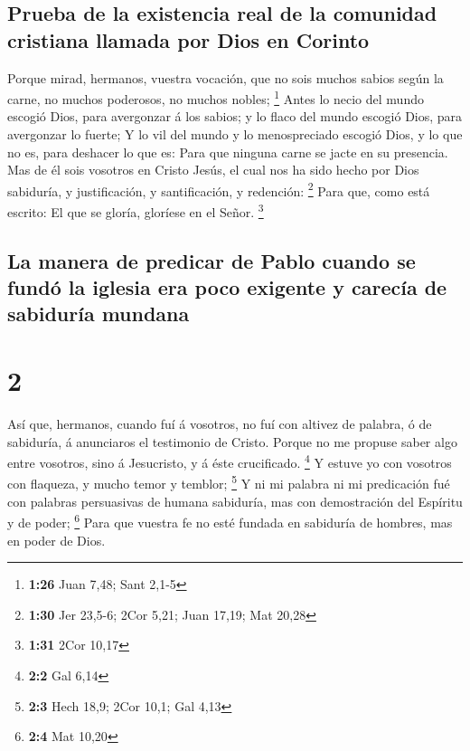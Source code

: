\hypertarget{prueba-de-la-existencia-real-de-la-comunidad-cristiana-llamada-por-dios-en-corinto}{%
\subsection{Prueba de la existencia real de la comunidad cristiana
llamada por Dios en
Corinto}\label{prueba-de-la-existencia-real-de-la-comunidad-cristiana-llamada-por-dios-en-corinto}}

 Porque mirad, hermanos, vuestra vocación, que no sois
muchos sabios según la carne, no muchos poderosos, no muchos nobles;
\footnote{\textbf{1:26} Juan 7,48; Sant 2,1-5}  Antes lo
necio del mundo escogió Dios, para avergonzar á los sabios; y lo flaco
del mundo escogió Dios, para avergonzar lo fuerte;  Y lo
vil del mundo y lo menospreciado escogió Dios, y lo que no es, para
deshacer lo que es:  Para que ninguna carne se jacte en
su presencia.  Mas de él sois vosotros en Cristo Jesús,
el cual nos ha sido hecho por Dios sabiduría, y justificación, y
santificación, y redención: \footnote{\textbf{1:30} Jer 23,5-6; 2Cor
  5,21; Juan 17,19; Mat 20,28}  Para que, como está
escrito: El que se gloría, gloríese en el Señor. \footnote{\textbf{1:31}
  2Cor 10,17}

\hypertarget{la-manera-de-predicar-de-pablo-cuando-se-funduxf3-la-iglesia-era-poco-exigente-y-carecuxeda-de-sabiduruxeda-mundana}{%
\subsection{La manera de predicar de Pablo cuando se fundó la iglesia
era poco exigente y carecía de sabiduría
mundana}\label{la-manera-de-predicar-de-pablo-cuando-se-funduxf3-la-iglesia-era-poco-exigente-y-carecuxeda-de-sabiduruxeda-mundana}}

\hypertarget{section-1}{%
\section{2}\label{section-1}}

 Así que, hermanos, cuando fuí á vosotros, no fuí con
altivez de palabra, ó de sabiduría, á anunciaros el testimonio de
Cristo.  Porque no me propuse saber algo entre vosotros,
sino á Jesucristo, y á éste crucificado. \footnote{\textbf{2:2} Gal 6,14}
 Y estuve yo con vosotros con flaqueza, y mucho temor y
temblor; \footnote{\textbf{2:3} Hech 18,9; 2Cor 10,1; Gal 4,13}
 Y ni mi palabra ni mi predicación fué con palabras
persuasivas de humana sabiduría, mas con demostración del Espíritu y de
poder; \footnote{\textbf{2:4} Mat 10,20}  Para que vuestra
fe no esté fundada en sabiduría de hombres, mas en poder de Dios.

